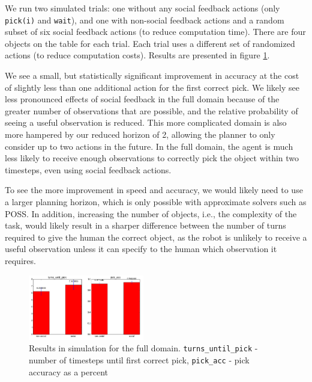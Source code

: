 \documentclass{article}
\begin{document}
\begin{multicols}{2}
We run two simulated trials: one without any social feedback actions (only \texttt{pick(i)} and \texttt{wait}), and one with non-social feedback actions and a random subset of six social feedback actions (to reduce computation time). There are four objects on the table for each trial. Each trial uses a different set of randomized actions (to reduce computation costs). Results are presented in figure \ref{fig:results}. 

We see a small, but statistically significant improvement in accuracy at the cost of slightly less than one additional action for the first correct pick.  We likely see less pronounced effects of social feedback in the full domain because of the greater number of observations that are possible, and the relative probability of seeing a useful observation is reduced. This more complicated domain is also more hampered by our reduced horizon of 2, allowing the planner to only consider up to two actions in the future. In the full domain, the agent is much less likely to receive enough observations to correctly pick the object within two timesteps, even using social feedback actions. 

To see the more improvement in speed and accuracy, we would likely need to use a larger planning horizon, which is only possible with approximate solvers such as POSS. In addition, increasing the number of objects, i.e., the complexity of the task, would likely result in a sharper difference between the number of turns required to give the human the correct object, as the robot is unlikely to receive a useful observation unless it can specify to the human which observation it requires. 



\begin{figure}[H]
\begin{center}
	\includegraphics[width=0.45\textwidth]{full_results}
\end{center}
\caption{Results in simulation for the full domain. \texttt{turns\_until\_pick} - number of timesteps until first correct pick,  \texttt{pick\_acc} - pick accuracy as a percent}
	\label{fig:results}
\end{figure}


\end{multicols}
\end{document}
